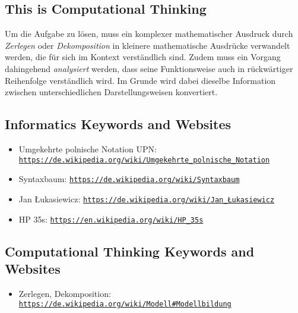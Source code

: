 \documentclass[a4paper,11pt]{report}
\newcommand{\BrochureUrlText}[1]{\texttt{#1}}
\begin{document}
\subsection*{This is Computational Thinking}

Um die Aufgabe zu lösen, muss ein komplexer mathematischer Ausdruck durch \emph{Zerlegen} oder \emph{Dekomposition} in kleinere mathematische Ausdrücke verwandelt werden, die für sich im Kontext verständlich sind. Zudem muss ein Vorgang dahingehend \emph{analysiert} werden, dass seine Funktionsweise auch in rückwärtiger Reihenfolge verständlich wird. Im Grunde wird dabei dieselbe Information zwischen unterschiedlichen Darstellungsweisen konvertiert.


\subsection*{Informatics Keywords and Websites}

\begin{itemize}
  \item Umgekehrte polnische Notation UPN: \href{https://de.wikipedia.org/wiki/Umgekehrte_polnische_Notation}{\BrochureUrlText{https://de.wikipedia.org/wiki/Umgekehrte\_polnische\_Notation}}
  \item Syntaxbaum: \href{https://de.wikipedia.org/wiki/Syntaxbaum}{\BrochureUrlText{https://de.wikipedia.org/wiki/Syntaxbaum}}
  \item Jan Łukasiewicz: \href{https://de.wikipedia.org/wiki/Jan_\%C5\%81ukasiewicz}{\BrochureUrlText{https://de.wikipedia.org/wiki/Jan\_Łukasiewicz}}
  \item HP 35s: \href{https://en.wikipedia.org/wiki/HP_35s}{\BrochureUrlText{https://en.wikipedia.org/wiki/HP\_35s}}
\end{itemize}


\subsection*{Computational Thinking Keywords and Websites}

\begin{itemize}
  \item Zerlegen, Dekomposition: \href{https://de.wikipedia.org/wiki/Modell\#Modellbildung}{\BrochureUrlText{https://de.wikipedia.org/wiki/Modell\#Modellbildung}}
\end{itemize}
\end{document}
